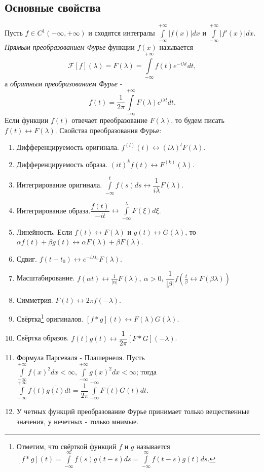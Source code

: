 \documentclass[a4paper,12pt]{scrartcl}
\newcommand{\F}{\mathcal{F}}
\begin{document}
\subsection{Основные свойства}
Пусть $f\in C^1(-\infty,+\infty)$ и сходятся интегралы $\int\limits_{-\infty}^{+\infty}|f(x)|dx$ и $\int\limits_{-\infty}^{+\infty}|f'(x)|dx$. \textit{Прямым преобразованием Фурье} функции $f(x)$ называется 
$$\F[f](\lambda) = F(\lambda) = \int\limits_{-\infty}^{+\infty}f(t)e^{-i\lambda t}dt,$$ 
а \textit{обратным преобразованием Фурье} -  
$$f(t) = \dfrac{1}{2\pi} \int\limits_{-\infty}^{+\infty}F(\lambda)e^{i\lambda t}dt.$$ 
Если функции $f(t)$ отвечает преобразование $F(\lambda)$, то будем писать $f(t)\leftrightarrow F(\lambda)$. Свойства преобразования Фурье:
\begin{enumerate}
\item Дифференцируемость оригинала. $f^{(l)}(t)\leftrightarrow (i\lambda)^lF(\lambda)$.
\item Дифференцируемость образа. $(it)^k f(t) \leftrightarrow F^{(k)}(\lambda)$.
\item Интегрирование оригинала. $\int\limits_{-\infty}^{t}f(s)ds \leftrightarrow \dfrac{1}{i\lambda}F(\lambda)$.
\item Интегрирование образа.$\dfrac{f(t)}{-it} \leftrightarrow \int\limits_{-\infty}^{\lambda}F(\xi)d\xi$.
\item Линейность. Если $f(t)\leftrightarrow F(\lambda)$ и $g(t)\leftrightarrow G(\lambda)$, то $\alpha f(t) + \beta g(t)\leftrightarrow \alpha F(\lambda) + \beta F(\lambda)$.
\item Сдвиг. $f(t-t_0)\leftrightarrow e^{-i\lambda t_0}F(\lambda)$.
\item Масштабирование. $f(\alpha t)\leftrightarrow \frac{1}{|\alpha|}F(\lambda),\ \alpha>0$, $\dfrac{1}{|\beta|}f\left(\frac{t}{\beta} \leftrightarrow F(\beta\lambda)\right)$
\item Симметрия. $F(t)\leftrightarrow 2\pi f(-\lambda)$.
\item Свёртка\footnote{Отметим, что свёрткой функций $f$ и $g$ называется $[f*g](t) = \int\limits_{-\infty}^{\infty}f(s)g(t-s)ds = \int\limits_{-\infty}^{\infty}f(t-s)g(t)ds$.} оригиналов. $[f*g](t) \leftrightarrow F(\lambda)G(\lambda)$.
\item Свёртка образов. $f(t)g(t) \leftrightarrow \dfrac{1}{2\pi}[F*G](-\lambda)$.
\item Формула Парсеваля - Плашернеля. Пусть $\int\limits_{-\infty}^{+\infty}f(x)^2dx < \infty, \int\limits_{-\infty}^{+\infty}g(x)^2dx < \infty$; тогда $\int\limits_{-\infty}^{+\infty}f(t)\overline{g(t)}dt = \dfrac{1}{2\pi}\int\limits_{-\infty}^{+\infty}\overline{F(t)}G(t)dt$. 
\item У четных функций преобразование Фурье принимает только вещественные значения, у нечетных - только мнимые.
\end{enumerate}
\end{document}
